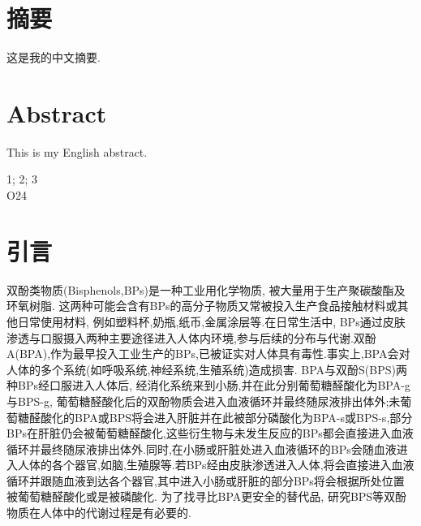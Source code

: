 \documentclass[a4paper,punct=banjiao,twoside]{ctexrep}
\theoremstyle{plain}
\theoremstyle{definition}
\theoremstyle{remark}
\begin{document}
\renewcommand{\contentsname}{目\quad 录}
\tableofcontents
\setcounter{page}{1}

\chapter*{摘\quad 要}
\normalsize

这是我的中文摘要.

\chapter*{Abstract}
\normalsize

This is my English abstract.

 1; 2; 3\\
 O24

\clearpage
\mbox{}
\thispagestyle{empty}




\renewcommand{\thepage}{\arabic{page}}
\setcounter{page}{0}












\chapter{引言}


双酚类物质(Bisphenols,BPs)是一种工业用化学物质, 被大量用于生产聚碳酸酯及环氧树脂\cite{3}. 这两种可能会含有BPs的高分子物质又常被投入生产食品接触材料或其他日常使用材料, 例如塑料杯,奶瓶,纸币,金属涂层等\cite{4}.在日常生活中, BPs通过皮肤渗透与口服摄入两种主要途径进入人体内环境,参与后续的分布与代谢.双酚A(BPA),作为最早投入工业生产的BPs,已被证实对人体具有毒性\cite{2}.事实上,BPA会对人体的多个系统(如呼吸系统,神经系统,生殖系统)造成损害\cite{5}.
BPA与双酚S(BPS)两种BPs经口服进入人体后, 经消化系统来到小肠,并在此分别葡萄糖醛酸化为BPA-g与BPS-g, 葡萄糖醛酸化后的双酚物质会进入血液循环并最终随尿液排出体外;未葡萄糖醛酸化的BPA或BPS将会进入肝脏并在此被部分磷酸化为BPA-s或BPS-s,部分BPs在肝脏仍会被葡萄糖醛酸化,这些衍生物与未发生反应的BPs都会直接进入血液循环并最终随尿液排出体外\cite{2,1}.同时,在小肠或肝脏处进入血液循环的BPs会随血液进入人体的各个器官,如脑,生殖腺等.若BPs经由皮肤渗透进入人体,将会直接进入血液循环并跟随血液到达各个器官,其中进入小肠或肝脏的部分BPs将会根据所处位置被葡萄糖醛酸化或是被磷酸化.
为了找寻比BPA更安全的替代品, 研究BPS等双酚物质在人体中的代谢过程是有必要的\cite{6}.
\end{document}
